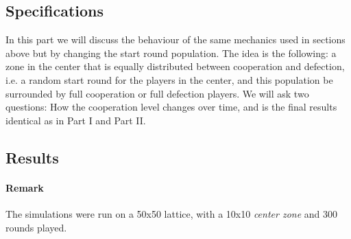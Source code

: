 \documentclass[letterpaper]{article}
\begin{document}
\subsection{Specifications}


In this part we will discuss the behaviour of the same mechanics used
in sections above but by changing the start round population. The idea is the
following: a zone in the center that is equally distributed
between cooperation and defection, i.e. a random start round for the
players in the center, and this population be surrounded by
full cooperation or full defection players. We will ask two questions:
How the cooperation level changes over time, and is the final results
identical as in Part I and Part II.

\subsection{Results}

\paragraph{Remark} The simulations were run on a 50x50 lattice, with
a 10x10 \textit{center zone} and 300 rounds played.
\end{document}
